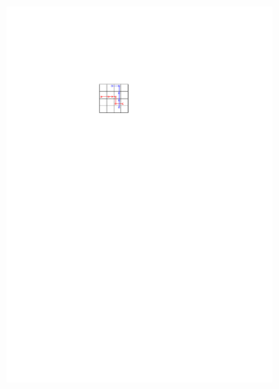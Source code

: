 \documentclass[letterpaper]{article}
\theoremstyle{definition}
\begin{document}
\begin{figure}[t]
\begin{subfigure}[b]{0.12\textwidth}
	\includegraphics[width=0.95\textwidth]{Figs/example1_paths.pdf}
    \caption{}
  \end{subfigure}
  \begin{subfigure}[b]{0.12\textwidth}

\end{subfigure}
\end{figure}
\end{document}
